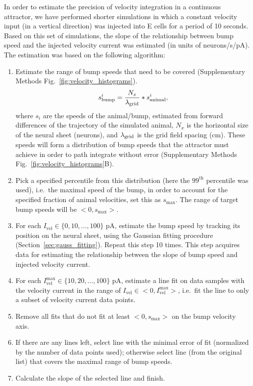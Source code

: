 \documentclass[a4paper,12pt]{article}
\newcommand{\ssc}[3]{\ensuremath{#1_{\text{#2}_{\text{#3}}}}}
\newcommand{\lamgrid}{\ssc{\lambda}{\scriptsize{grid}}{}}
\begin{document}
In order to estimate the precision of velocity integration in a continuous
attractor, we have performed shorter simulations in which a constant velocity
input (in a vertical direction) was injected into E cells for a period of 10
seconds. Based on this set of simulations, the slope of the relationship
between bump speed and the injected velocity current was estimated (in units of
neurons/s/pA).  The estimation was based on the following algorithm:
\begin{enumerate}
    \item Estimate the range of bump speeds that need to be covered
        (Supplementary Methods Fig.~\ref{fig:velocity_histograms}).
        \begin{equation}
        s_{\text{bump}}^i =
        \frac{N_x}{\lamgrid}*s_{\text{animal}}^i,
        \label{eq:bump_speeds}
        \end{equation}
        where $s_{i}$ are the speeds of the animal/bump, estimated from forward
        differences of the trajectory of the simulated animal, $N_x$ is the
        horizontal size of the neural sheet (neurons), and $\lamgrid$ is the grid
        field spacing (cm).  These speeds will form a distribution of bump
        speeds that the attractor must achieve in order to path integrate
        without error (Supplementary Methods Fig.~\ref{fig:velocity_histograms}B).
    \item Pick a specified percentile from this distribution (here the
        $99^\text{th}$ percentile was used), i.e.\ the maximal speed of the
        bump, in order to account for the specified fraction of animal
        velocities, set this as $s_{\text{max}}$. The range of target bump
        speeds will be $<0, s_{\text{max}}>$.
    \item For each $I_{\text{vel}} \in \{0, 10, \dots, 100\}$ pA, estimate the
        bump speed by tracking its position on the neural sheet, using the
        Gaussian fitting procedure (Section~\ref{sec:gauss_fitting}). Repeat
        this step 10 times. This step acquires data for estimating the
        relationship between the slope of bump speed and injected velocity
        current.
    \item For each $I_{\text{vel}}^{\text{max}} \in \{10, 20, \dots, 100\}$ pA,
        estimate a line fit on data samples with the velocity current in the
        range of $I_{\text{vel}} \in <0, I_{\text{vel}}^{\text{max}}>$, i.e.\ 
        fit the line to only a subset of velocity current data points.
    \item Remove all fits that do not fit at least $<0, s_{\text{max}}>$ on the
        bump velocity axis.
    \item If there are any lines left, select line with the minimal error
        of fit (normalized by the number of data points used); otherwise select
        line (from the original list) that covers the maximal range of bump
        speeds.
    \item Calculate the slope of the selected line and finish.
\end{enumerate}
\end{document}
